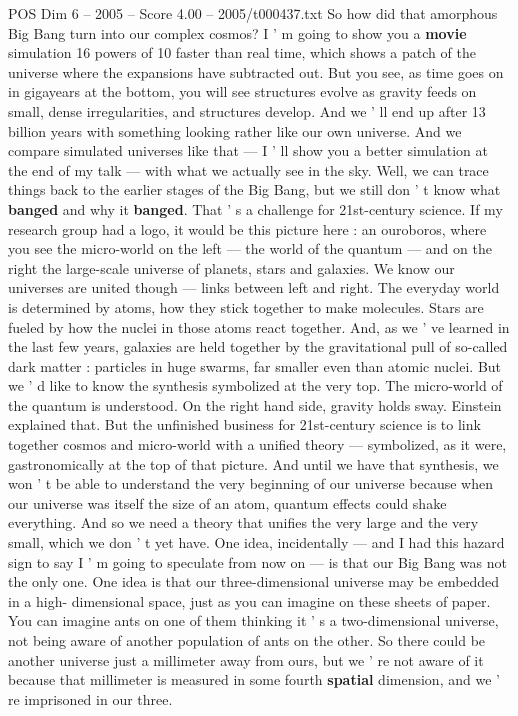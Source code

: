 \begin{textsample}{POS Dim 6 – 2005 – Score 4.00 – 2005/t000437.txt}
So how did that amorphous Big Bang turn into our complex cosmos?
I ' m going to show you a \textbf{movie} simulation 16 powers of 10 faster than real time, which shows a patch of the universe where the expansions have subtracted out.
But you see, as time goes on in gigayears at the bottom, you will see structures evolve as gravity feeds on small, dense irregularities, and structures develop.
And we ' ll end up after 13 billion years with something looking rather like our own universe.
And we compare simulated universes like that — I ' ll show you a better simulation at the end of my talk — with what we actually see in the sky.
Well, we can trace things back to the earlier stages of the Big Bang, but we still don ' t know what \textbf{banged} and why it \textbf{banged}.
That ' s a challenge for 21st-century science.
If my research group had a logo, it would be this picture here : an ouroboros, where you see the micro-world on the left — the world of the quantum — and on the right the large-scale universe of planets, stars and galaxies.
We know our universes are united though — links between left and right.
The everyday world is determined by atoms, how they stick together to make molecules.
Stars are fueled by how the nuclei in those atoms react together.
And, as we ' ve learned in the last few years, galaxies are held together by the gravitational pull of so-called dark matter : particles in huge swarms, far smaller even than atomic nuclei.
But we ' d like to know the synthesis symbolized at the very top.
The micro-world of the quantum is understood.
On the right hand side, gravity holds sway.
Einstein explained that.
But the unfinished business for 21st-century science is to link together cosmos and micro-world with a unified theory — symbolized, as it were, gastronomically at the top of that picture.
And until we have that synthesis, we won ' t be able to understand the very beginning of our universe because when our universe was itself the size of an atom, quantum effects could shake everything.
And so we need a theory that unifies the very large and the very small, which we don ' t yet have.
One idea, incidentally — and I had this hazard sign to say I ' m going to speculate from now on — is that our Big Bang was not the only one.
One idea is that our three-dimensional universe may be embedded in a high- dimensional space, just as you can imagine on these sheets of paper.
You can imagine ants on one of them thinking it ' s a two-dimensional universe, not being aware of another population of ants on the other.
So there could be another universe just a millimeter away from ours, but we ' re not aware of it because that millimeter is measured in some fourth \textbf{spatial} dimension, and we ' re imprisoned in our three.

\end{textsample}
